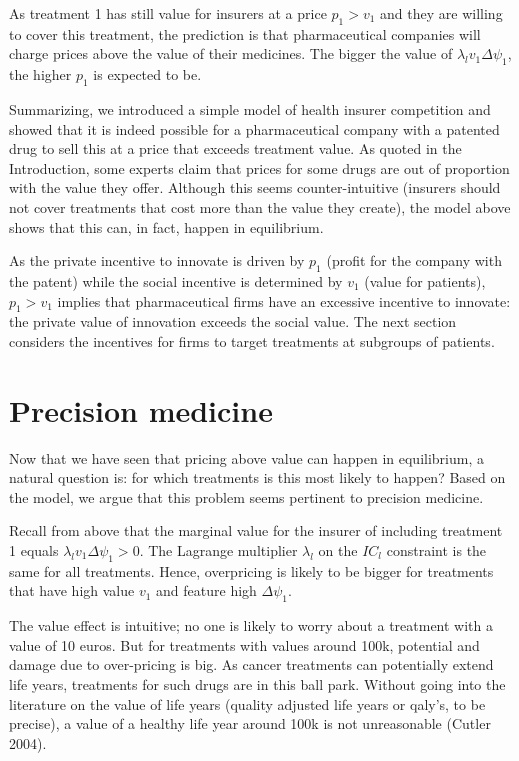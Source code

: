 \documentclass[a4paper,12pt]{article}
\makeatletter
\newcommand{\citeprocitem}[2]{\hyper@linkstart{cite}{citeproc_bib_item_#1}#2\hyper@linkend}
\makeatother
\begin{document}
As treatment 1 has still value for insurers at a price \(p_1 > v_1\) and they are willing to cover this treatment, the prediction is that pharmaceutical companies will charge prices above the value of their medicines. The bigger the value of \(\lambda_l v_1 \Delta \psi_1\), the higher \(p_1\) is expected to be.

Summarizing, we introduced a simple model of health insurer competition and showed that it is indeed possible for a pharmaceutical company with a patented drug to sell this at a price that exceeds treatment value. As quoted in the Introduction, some experts claim that prices for some drugs are out of proportion with the value they offer. Although this seems counter-intuitive (insurers should not cover treatments that cost more than the value they create), the model above shows that this can, in fact, happen in equilibrium.

As the private incentive to innovate is driven by \(p_1\) (profit for the company with the patent) while the social incentive is determined by \(v_1\) (value for patients), \(p_1>v_1\) implies that pharmaceutical firms have an excessive incentive to innovate: the private value of innovation exceeds the social value. The next section considers the incentives for firms to target treatments at subgroups of patients.


\section{Precision medicine}
\label{sec:orge3dc495}

Now that we have seen that pricing above value can happen in equilibrium, a natural question is: for which treatments is this most likely to happen? Based on the model, we argue that this problem seems pertinent to precision medicine.

Recall from above that the marginal value for the insurer of including treatment 1 equals \(\lambda_l v_1 \Delta \psi_1 >0\). The Lagrange multiplier \(\lambda_l\) on the \(IC_l\) constraint is the same for all treatments. Hence, overpricing is likely to be bigger for treatments that have high value \(v_1\) and feature high \(\Delta \psi_1\).

The value effect is intuitive; no one is likely to worry about a treatment with a value of 10 euros. But for treatments with values around 100k, potential and damage due to over-pricing is big. As cancer treatments can potentially extend life years, treatments for such drugs are in this ball park. Without going into the literature on the value of life years (quality adjusted life years or qaly's, to be precise), a value of a healthy life year around 100k is not unreasonable (\citeprocitem{9}{Cutler 2004}).
\end{document}
